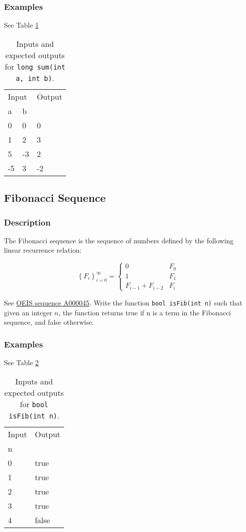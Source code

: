 \documentclass{article}
\begin{document}
\subsubsection{Examples}
See Table \ref{tab:sum}

\begin{table}[h!]
\begin{tabular}{ll|l}
\multicolumn{2}{l|}{Input} & Output \\
a            & b           &        \\ \hline
0            & 0           & 0      \\
1            & 2           & 3      \\
5            & -3          & 2      \\
-5           & 3           & -2    
\end{tabular}
\caption{Inputs and expected outputs for {\tt long sum(int a, int b)}.}
\label{tab:sum}
\end{table}

\subsection{Fibonacci Sequence}
\subsubsection{Description}
The Fibonacci sequence is the sequence of numbers defined by the following linear recurrence relation:

\begin{equation}
  \left \{     F_i     \right \}_{i=0}^{\infty } = \begin{cases}
    0 & F_0\\
    1 & F_1 \\
    F_{i-1} + F_{i-2} & F_i
  \end{cases}
\end{equation}

See \href{https://oeis.org/A000045}{OEIS sequence A000045}.
Write the function {\tt bool isFib(int n)} such that given an integer $n$, the function returns true if n is a term in the Fibonacci sequence, and false otherwise.

\subsubsection{Examples}
See Table \ref{tab:isfib}

\begin{table}[h!]
\begin{tabular}{l|l}
Input & Output \\
n     &        \\ \hline
0     & true   \\
1     & true   \\
2     & true   \\
3     & true   \\
4     & false 
\end{tabular}
\caption{Inputs and expected outputs for {\tt bool isFib(int n)}.}
\label{tab:isfib}
\end{table}
\end{document}
